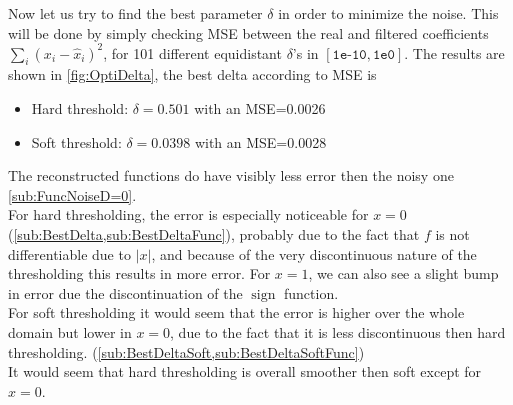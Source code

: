 \documentclass[a4paper]{article}
\DeclareMathOperator*{\sign}{sign}
\begin{document}
	Now let us try to find the best parameter $\delta$ in order to minimize the noise. This will be done by simply checking MSE between the real and filtered coefficients $\sum_{i} (x_i - \hat{x}_i)^2$, for 101 different equidistant $\delta$'s in $[\texttt{1e-10},\texttt{1e0}]$. The results are shown in \cref{fig:OptiDelta}, the best delta according to MSE is 
	\begin{itemize}
		\item Hard threshold: $\delta = 0.501$ with an MSE=0.0026
		\item Soft threshold: $\delta = 0.0398$ with an MSE=0.0028
	\end{itemize}
	The reconstructed functions do have visibly less error then the noisy one \cref{sub:FuncNoiseD=0}.\\
	For hard thresholding, the error is especially noticeable for $x = 0$ (\cref{sub:BestDelta,sub:BestDeltaFunc}), probably due to the fact that $f$ is not differentiable due to $|x|$, and because of the very discontinuous nature of the thresholding this results in more error. For $x = 1$, we can also see a slight bump in error due the discontinuation of the $\sign$ function.\\
	For soft thresholding it would seem that the error is higher over the whole domain but lower in $x=0$, due to the fact that it is less discontinuous then hard thresholding. (\cref{sub:BestDeltaSoft,sub:BestDeltaSoftFunc}) \\
	
	It would seem that hard thresholding is overall smoother then soft except for $x=0$. 
\end{document}
